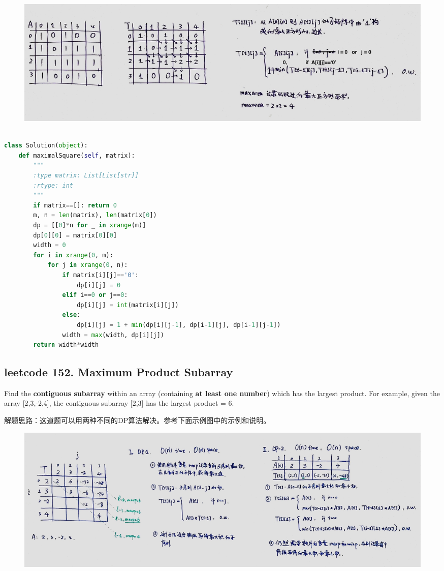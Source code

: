 \documentclass[a4paper,10pt]{article}
\begin{document}
\begin{figure}[h]
\includegraphics[width=\textwidth]{leetcode221.jpg}
\centering \\
\end{figure}

\begin{lstlisting}[language=Python, caption=Problem221. Maximal Square]

class Solution(object):
    def maximalSquare(self, matrix):
        """
        :type matrix: List[List[str]]
        :rtype: int
        """
        if matrix==[]: return 0
        m, n = len(matrix), len(matrix[0])
        dp = [[0]*n for _ in xrange(m)]
        dp[0][0] = matrix[0][0]
        width = 0
        for i in xrange(0, m):
            for j in xrange(0, n):
                if matrix[i][j]=='0':
                    dp[i][j] = 0
                elif i==0 or j==0:
                    dp[i][j] = int(matrix[i][j])
                else:
                    dp[i][j] = 1 + min(dp[i][j-1], dp[i-1][j], dp[i-1][j-1])
                width = max(width, dp[i][j])
        return width*width
\end{lstlisting}







\subsection{leetcode 152. Maximum Product Subarray}
Find the \textbf{contiguous subarray} within an array (containing \textbf{at least one number}) which has the largest product. For example, given the array [2,3,-2,4], the contiguous subarray [2,3] has the largest product = 6. \\

\begin{CJK*}{UTF8}{gbsn}
\noindent 解题思路：这道题可以用两种不同的DP算法解决。参考下面示例图中的示例和说明。
\end{CJK*}

\begin{figure}[h]
\includegraphics[width=\textwidth]{leetcode152.jpg}
\centering \\
\end{figure}
\end{document}
